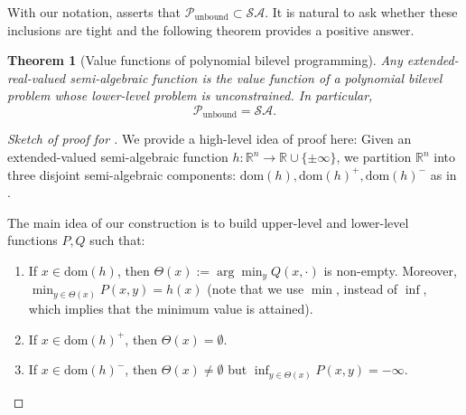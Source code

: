 \documentclass{article}
\newcommand*{\cP}{\mathcal{P}}
\newcommand*{\RR}{\mathbb{R}}
\newcommand{\argmin}{\arg\min}
\newcommand{\firstvar}{x}
\newcommand{\secondvar}{y}
\newcommand{\SA}{\mathcal{SA}}
\newcommand{\unbounded}{\text{unbound}}
\newcommand{\dom}{\mathrm{dom}}
\theoremstyle{plain}
\newtheorem{theorem}{Theorem}[section]
\theoremstyle{definition}
\begin{document}
With our notation,  asserts that $\cP_{\unbounded} \subset \SA$. It is natural to ask whether these inclusions are tight and the following theorem provides a positive answer.
\begin{theorem}[Value functions of  polynomial bilevel programming]
    \label{theorem:closed=SA}
    Any extended-real-valued semi-algebraic function is the value function of a polynomial bilevel problem whose lower-level problem is unconstrained. In particular,
    \emph{$$\cP_{\unbounded} =  \SA.$$}
\end{theorem}
\begin{proof}[Sketch of proof for ]
    We provide a high-level idea of proof here:
    Given an extended-valued semi-algebraic function $h: \RR^n \to \RR \cup \{\pm \infty\}$, we partition $\RR^n$ into three disjoint semi-algebraic components: $\dom(h), \dom(h)^+, \dom(h)^-$ as in .
    
    The main idea of our construction is to build upper-level and lower-level functions $P, Q$ such that:
    \begin{enumerate}
        \item If $\firstvar \in \dom(h)$, then $\Theta(\firstvar) := \argmin_\secondvar Q(\firstvar, \cdot)$ is non-empty. Moreover, $\min_{\secondvar \in \Theta(\firstvar)} P(\firstvar, \secondvar) = h(\firstvar)$ (note that we use $\min$, instead of $\inf$, which implies that the minimum value is attained).
        \item If $\firstvar \in \dom(h)^+$, then $\Theta(\firstvar) = \emptyset$.
        \item If $\firstvar \in \dom(h)^-$, then $\Theta(\firstvar) \neq \emptyset$ but $\inf_{\secondvar \in \Theta(\firstvar)} P(\firstvar, \secondvar) = - \infty$.
    \end{enumerate}
\end{proof}
\end{document}
